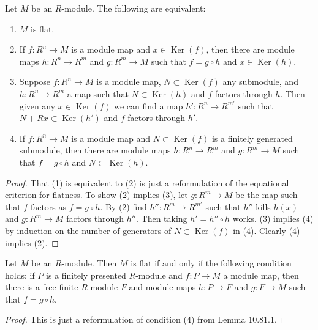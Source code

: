 \begin{lemma}[10.81.1]
Let $M$ be an $R$-module. The following are equivalent:
\begin{enumerate}
\item $M$ is flat.
\item If $f:R^n\to M$ is a module map and $x\in\operatorname{Ker}(f)$, then there are module maps $h:R^n\to R^m$ and $g:R^m\to M$ such that $f=g\circ h$ and $x\in\operatorname{Ker}(h)$.
\item Suppose $f:R^n\to M$ is a module map, $N\subset\operatorname{Ker}(f)$ any submodule, and $h:R^n\to R^m$ a map such that $N\subset\operatorname{Ker}(h)$ and $f$ factors through $h$. Then given any $x\in\operatorname{Ker}(f)$ we can find a map $h':R^n\to R^{m'}$ such that $N+Rx\subset\operatorname{Ker}(h')$ and $f$ factors through $h'$.
\item If $f:R^n\to M$ is a module map and $N\subset\operatorname{Ker}(f)$ is a finitely generated submodule, then there are module maps $h:R^n\to R^m$ and $g:R^m\to M$ such that $f=g\circ h$ and $N\subset\operatorname{Ker}(h)$.
\end{enumerate}
\end{lemma}
\begin{proof}
That (1) is equivalent to (2) is just a reformulation of the equational criterion for flatness. To show (2) implies (3), let $g:R^m\to M$ be the map such that $f$ factors as $f=g\circ h$. By (2) find $h'':R^m\to R^{m'}$ such that $h''$ kills $h(x)$ and $g:R^m\to M$ factors through $h''$. Then taking $h'=h''\circ h$ works. (3) implies (4) by induction on the number of generators of $N\subset\operatorname{Ker}(f)$ in (4). Clearly (4) implies (2).
\end{proof}

\begin{lemma}[10.81.2]
Let $M$ be an $R$-module. Then $M$ is flat if and only if the following condition holds: if $P$ is a finitely presented $R$-module and $f:P\to M$ a module map, then there is a free finite $R$-module $F$ and module maps $h:P\to F$ and $g:F\to M$ such that $f=g\circ h$.
\end{lemma}
\begin{proof}
This is just a reformulation of condition (4) from Lemma 10.81.1.
\end{proof}

